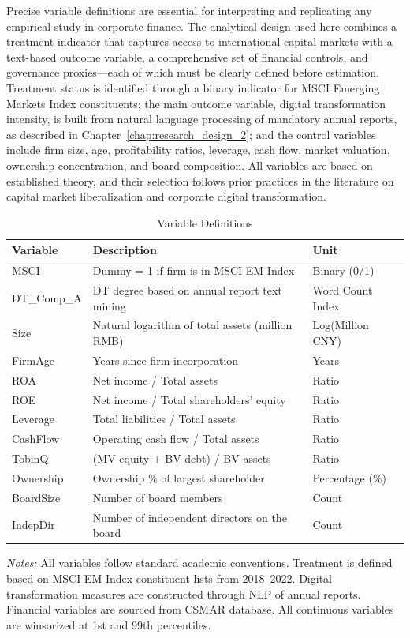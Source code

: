 Precise variable definitions are essential for interpreting and replicating any empirical study in corporate finance. The analytical design used here combines a treatment indicator that captures access to international capital markets with a text-based outcome variable, a comprehensive set of financial controls, and governance proxies---each of which must be clearly defined before estimation. Treatment status is identified through a binary indicator for MSCI Emerging Markets Index constituents; the main outcome variable, digital transformation intensity, is built from natural language processing of mandatory annual reports, as described in Chapter~\ref{chap:research_design_2}; and the control variables include firm size, age, profitability ratios, leverage, cash flow, market valuation, ownership concentration, and board composition. All variables are based on established theory, and their selection follows prior practices in the literature on capital market liberalization and corporate digital transformation.

\begin{table}[htbp]
\centering
\caption{Variable Definitions}
\label{tab:variable_definitions}
\small
\begin{tabular}{lll}
\toprule
\textbf{Variable} & \textbf{Description} & \textbf{Unit} \\
\midrule
MSCI & Dummy = 1 if firm is in MSCI EM Index & Binary (0/1) \\
DT\_Comp\_A & DT degree based on annual report text mining & Word Count Index \\
Size & Natural logarithm of total assets (million RMB) & Log(Million CNY) \\
FirmAge & Years since firm incorporation & Years \\
ROA & Net income / Total assets & Ratio \\
ROE & Net income / Total shareholders' equity & Ratio \\
Leverage & Total liabilities / Total assets & Ratio \\
CashFlow & Operating cash flow / Total assets & Ratio \\
TobinQ & (MV equity + BV debt) / BV assets & Ratio \\
Ownership & Ownership \% of largest shareholder & Percentage (\%) \\
BoardSize & Number of board members & Count \\
IndepDir & Number of independent directors on the board & Count \\
\bottomrule
\end{tabular}
\begin{tablenotes}
\small
\item \textit{Notes:} All variables follow standard academic conventions. Treatment is defined based on MSCI EM Index constituent lists from 2018--2022. Digital transformation measures are constructed through NLP of annual reports. Financial variables are sourced from CSMAR database. All continuous variables are winsorized at 1st and 99th percentiles.
\end{tablenotes}
\end{table}

